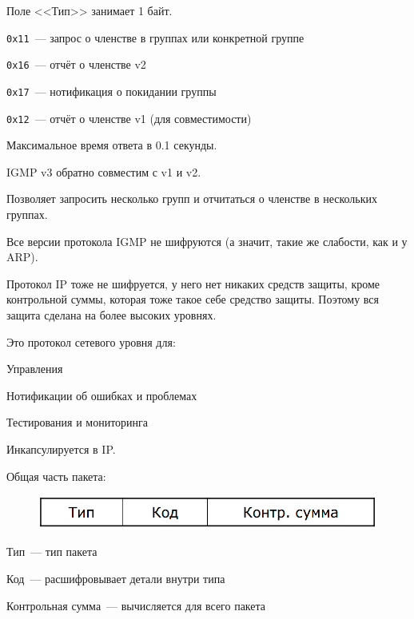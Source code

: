 Поле <<Тип>> занимает 1 байт.
\begin{MyItemize}
    \item {\tt 0x11}~--- запрос о членстве в группах или конкретной группе
    \item {\tt 0x16}~--- отчёт о членстве v2
    \item {\tt 0x17}~--- нотификация о покидании группы
    \item {\tt 0x12}~--- отчёт о членстве v1 (для совместимости)
\end{MyItemize}

Максимальное время ответа в 0.1 секунды.

IGMP v3 обратно совместим с v1 и v2.

Позволяет запросить несколько групп и отчитаться о членстве в нескольких группах.

Все версии протокола IGMP не шифруются (а значит, такие же слабости, как и у ARP).

Протокол IP тоже не шифруется, у него нет никаких средств защиты, кроме контрольной суммы, которая тоже такое себе средство защиты. Поэтому вся защита сделана на более высоких уровнях.


Это протокол сетевого уровня для:
\begin{MyItemize}
    \item Управления
    \item Нотификации об ошибках и проблемах
    \item Тестирования и мониторинга
\end{MyItemize}

Инкапсулируется в IP. 

Общая часть пакета:

\begin{figure}[H]
  \centering
  \includegraphics[width=15cm]{images/02/09}
\end{figure}

\begin{MyItemize}
    \item Тип~--- тип пакета
    \item Код~--- расшифровывает детали внутри типа
    \item Контрольная сумма~--- вычисляется для всего пакета
\end{MyItemize}

